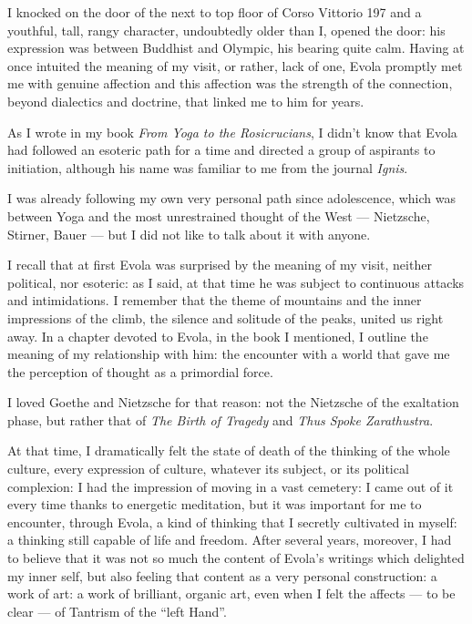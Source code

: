 I knocked on the door of the next to top floor of Corso Vittorio 197 and a youthful, tall, rangy character, undoubtedly older than I, opened the door: his expression was between Buddhist and Olympic, his bearing quite calm. Having at once intuited the meaning of my visit, or rather, lack of one, Evola promptly met me with genuine affection and this affection was the strength of the connection, beyond dialectics and doctrine, that linked me to him for years.

As I wrote in my book \emph{From Yoga to the Rosicrucians}, I didn't know that Evola had followed an esoteric path for a time and directed a group of aspirants to initiation, although his name was familiar to me from the journal \emph{Ignis}.

I was already following my own very personal path since adolescence, which was between Yoga and the most unrestrained thought of the West --- Nietzsche, Stirner, Bauer --- but I did not like to talk about it with anyone.

I recall that at first Evola was surprised by the meaning of my visit, neither political, nor esoteric: as I said, at that time he was subject to continuous attacks and intimidations. I remember that the theme of mountains and the inner impressions of the climb, the silence and solitude of the peaks, united us right away. In a chapter devoted to Evola, in the book I mentioned, I outline the meaning of my relationship with him: the encounter with a world that gave me the perception of thought as a primordial force.

I loved Goethe and Nietzsche for that reason: not the Nietzsche of the exaltation phase, but rather that of \emph{The Birth of Tragedy} and \emph{Thus Spoke Zarathustra}.


At that time, I dramatically felt the state of death of the thinking of the whole culture, every expression of culture, whatever its subject, or its political complexion: I had the impression of moving in a vast cemetery: I came out of it every time thanks to energetic meditation, but it was important for me to encounter, through Evola, a kind of thinking that I secretly cultivated in myself: a thinking still capable of life and freedom. After several years, moreover, I had to believe that it was not so much the content of Evola's writings which delighted my inner self, but also feeling that content as a very personal construction: a work of art: a work of brilliant, organic art, even when I felt the affects --- to be clear --- of Tantrism of the ``left Hand''.

